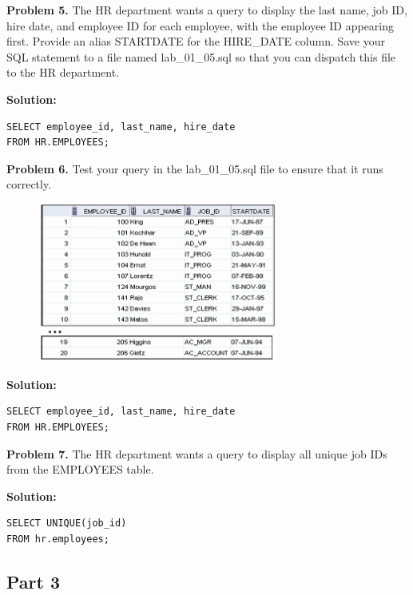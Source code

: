 \documentclass[12pt,a4paper]{article}
\begin{document}
\vspace{0.5cm}

\textbf{Problem 5.} The HR department wants a query to display the last name, job ID, hire date, and employee ID for each employee, with the employee ID appearing first. Provide an alias STARTDATE for the HIRE\_DATE column. Save your SQL statement to a file named lab\_01\_05.sql so that you can dispatch this file to the HR department.

\textbf{Solution:}
\begin{lstlisting}[style=sqlstyle]
SELECT employee_id, last_name, hire_date 
FROM HR.EMPLOYEES;
\end{lstlisting}

\vspace{0.5cm}

\textbf{Problem 6.} Test your query in the lab\_01\_05.sql file to ensure that it runs correctly.
\begin{figure}[htbp]
  \centering
  \includegraphics[width=0.7\textwidth]{Screenshots/16.png}
\end{figure}

\textbf{Solution:}
\begin{lstlisting}[style=sqlstyle]
SELECT employee_id, last_name, hire_date 
FROM HR.EMPLOYEES;
\end{lstlisting}

\vspace{0.5cm}

\textbf{Problem 7.} The HR department wants a query to display all unique job IDs from the EMPLOYEES table.


\textbf{Solution:}
\begin{lstlisting}[style=sqlstyle]
SELECT UNIQUE(job_id) 
FROM hr.employees;
\end{lstlisting}

\vspace{0.5cm}

\subsection{Part 3}
\end{document}
